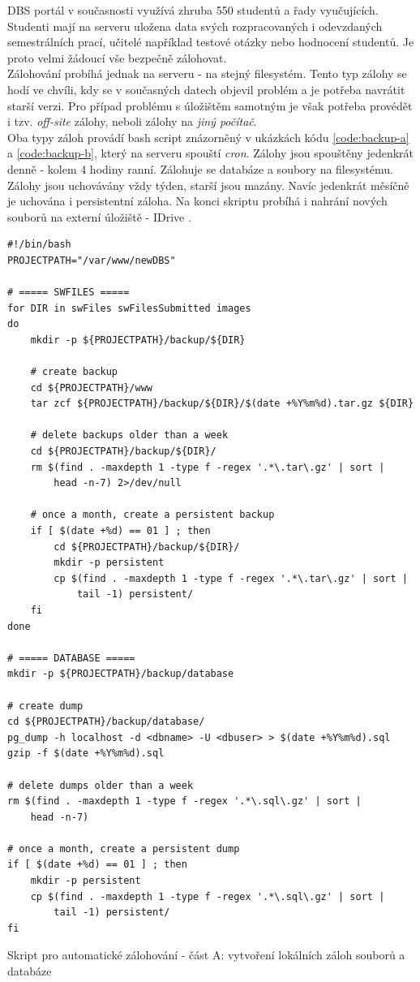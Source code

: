 DBS portál v současnosti využívá zhruba 550 studentů a řady vyučujících. Studenti mají na serveru uložena data svých rozpracovaných i odevzdaných semestrálních prací, učitelé například testové otázky nebo hodnocení studentů. Je proto velmi žádoucí vše bezpečně zálohovat.\\
Zálohování probíhá jednak na serveru - na stejný filesystém. Tento typ zálohy se hodí ve chvíli, kdy se v současných datech objevil problém a je potřeba navrátit starší verzi. Pro případ problému s úložištěm samotným je však potřeba provédět i tzv. \emph{off-site} zálohy, neboli zálohy na \emph{jiný počítač}.\\
Oba typy záloh provádí bash script znázorněný v ukázkách kódu \ref{code:backup-a} a \ref{code:backup-b}, který na serveru spouští \emph{cron}. Zálohy jsou spouštěny jedenkrát denně - kolem 4 hodiny ranní. Zálohuje se databáze a soubory na filesystému. Zálohy jsou uchovávány vždy týden, starší jsou mazány. Navíc jedenkrát měsíčně je uchována i persistentní záloha. Na konci skriptu probíhá i nahrání nových souborů na externí úložiště - IDrive \cite{idrive}.
\begin{listing}[H]
	\begin{verbatim}
#!/bin/bash
PROJECTPATH="/var/www/newDBS"

# ===== SWFILES =====
for DIR in swFiles swFilesSubmitted images
do
    mkdir -p ${PROJECTPATH}/backup/${DIR}

    # create backup
    cd ${PROJECTPATH}/www
    tar zcf ${PROJECTPATH}/backup/${DIR}/$(date +%Y%m%d).tar.gz ${DIR}

    # delete backups older than a week
    cd ${PROJECTPATH}/backup/${DIR}/
    rm $(find . -maxdepth 1 -type f -regex '.*\.tar\.gz' | sort |
        head -n-7) 2>/dev/null

    # once a month, create a persistent backup
    if [ $(date +%d) == 01 ] ; then
        cd ${PROJECTPATH}/backup/${DIR}/
        mkdir -p persistent
        cp $(find . -maxdepth 1 -type f -regex '.*\.tar\.gz' | sort |
            tail -1) persistent/
    fi
done

# ===== DATABASE =====
mkdir -p ${PROJECTPATH}/backup/database

# create dump
cd ${PROJECTPATH}/backup/database/
pg_dump -h localhost -d <dbname> -U <dbuser> > $(date +%Y%m%d).sql
gzip -f $(date +%Y%m%d).sql

# delete dumps older than a week
rm $(find . -maxdepth 1 -type f -regex '.*\.sql\.gz' | sort |
    head -n-7)

# once a month, create a persistent dump
if [ $(date +%d) == 01 ] ; then
    mkdir -p persistent
    cp $(find . -maxdepth 1 -type f -regex '.*\.sql\.gz' | sort |
        tail -1) persistent/
fi
	\end{verbatim}
	\caption{Skript pro automatické zálohování - část A: vytvoření lokálních záloh souborů a databáze} \label{code:backup-a}
\end{listing}
